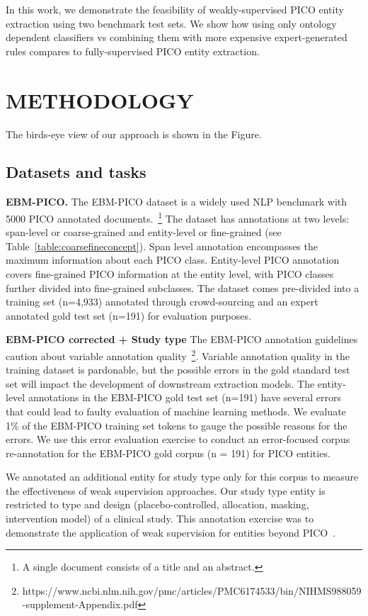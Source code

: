 \documentclass[10.7pt,]{article}
\begin{document}
In this work, we demonstrate the feasibility of weakly-supervised PICO entity extraction using two benchmark test sets.
We show how using only ontology dependent classifiers vs combining them with more expensive expert-generated rules compares to fully-supervised PICO entity extraction.
%
%
%
\section{METHODOLOGY}\label{methods}
%
The birds-eye view of our approach is shown in the Figure.
%
%
%
\subsection{Datasets and tasks}\label{data}
%
\textbf{EBM-PICO.}
The EBM-PICO dataset is a widely used NLP benchmark with 5000 PICO annotated documents.~\footnote{A single document consists of a title and an abstract.}
The dataset has annotations at two levels: span-level or coarse-grained and entity-level or fine-grained (see Table~\ref{table:coarsefineconcept}).
Span level annotation encompasses the maximum information about each PICO class.
Entity-level PICO annotation covers fine-grained PICO information at the entity level, with PICO classes further divided into fine-grained subclasses.
The dataset comes pre-divided into a training set (n=4,933) annotated through crowd-sourcing and an expert annotated gold test set (n=191) for evaluation purposes.


\textbf{EBM-PICO corrected + Study type}
The EBM-PICO annotation guidelines caution about variable annotation quality~\footnote{https://www.ncbi.nlm.nih.gov/pmc/articles/PMC6174533/bin/NIHMS988059-supplement-Appendix.pdf}.
Variable annotation quality in the training dataset is pardonable, but the possible errors in the gold standard test set will impact the development of downstream extraction models.
The entity-level annotations in the EBM-PICO gold test set (n=191) have several errors that could lead to faulty evaluation of machine learning methods.
We evaluate 1\% of the EBM-PICO training set tokens to gauge the possible reasons for the errors.
We use this error evaluation exercise to conduct an error-focused corpus re-annotation for the EBM-PICO gold corpus (n = 191) for PICO entities.
 
We annotated an additional entity for study type only for this corpus to measure the effectiveness of weak supervision approaches.
Our study type entity is restricted to type and design (placebo-controlled, allocation, masking, intervention model) of a clinical study.
This annotation exercise was to demonstrate the application of weak supervision for entities beyond PICO~\cite{menard2019turning}.
\end{document}
